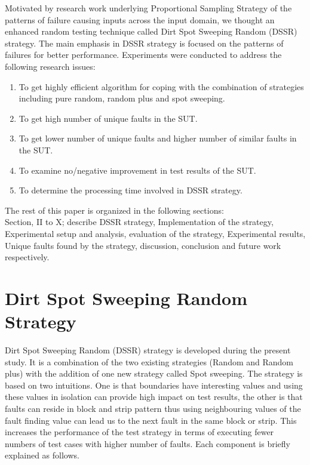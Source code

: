 \documentclass[conference]{IEEEtran}
\begin{document}
\indent Motivated by research work underlying Proportional Sampling Strategy of the patterns of failure causing inputs across the input domain, we thought an enhanced random testing technique called Dirt Spot Sweeping Random (DSSR) strategy. The main emphasis in DSSR strategy is focused on the patterns of failures for better performance. Experiments were conducted to address the following research issues:
\begin{enumerate}

\item To get highly efficient algorithm for coping with the combination of strategies including pure random, random plus and spot sweeping.

\item To get high number of unique faults in the SUT. 

\item To get lower number of unique faults and higher number of similar faults in the SUT.

\item  To examine no/negative improvement in test results of the SUT. 

\item  To determine the processing time involved in DSSR strategy.

\end{enumerate}
The rest of this paper is organized in the following sections: \\
Section, II to X; describe DSSR strategy, Implementation of the strategy, Experimental setup and analysis, evaluation of the strategy, Experimental results, Unique faults found by the strategy, discussion, conclusion and future work respectively.




\section{Dirt Spot Sweeping Random Strategy}
Dirt Spot Sweeping Random (DSSR) strategy is developed during the present study. It is a combination of the two existing strategies (Random and Random plus) with the addition of one new strategy called Spot sweeping. The strategy is based on two intuitions. One is that boundaries have interesting values and using these values in isolation can provide high impact on test results, the other is that faults can reside in block and strip pattern thus using neighbouring values of the fault finding value can lead us to the next fault in the same block or strip. This increases the performance of the test strategy in terms of executing fewer numbers of test cases with higher number of faults. Each component is briefly explained as follows. 
\end{document}
